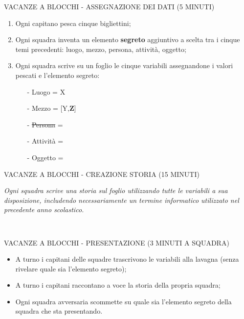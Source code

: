 \documentclass[aspectratio=1610]{beamer}
\begin{document}
\begin{frame}{VACANZE A BLOCCHI - ASSEGNAZIONE DEI DATI (5 MINUTI)} 
    \begin{enumerate}
        \item Ogni capitano pesca cinque bigliettini;
        \pause
        \item Ogni squadra inventa un elemento \textbf{segreto} aggiuntivo a scelta tra i cinque temi precedenti: luogo, mezzo, persona, attività, oggetto;
        \pause
        \item Ogni squadra scrive su un foglio le cinque variabili assegnandone i valori pescati e l'elemento segreto:
                \begin{itemize}
                    \item[-] Luogo = X
                    \item[-] Mezzo = [Y,\textbf{Z}]
                    \item[-] \sout{Persona} =
                    \item[-] Attività =
                    \item[-] Oggetto =
                \end{itemize}
    \end{enumerate}
\end{frame}

\begin{frame}{VACANZE A BLOCCHI - CREAZIONE STORIA (15 MINUTI)}
    \begin{minipage}{0.98\linewidth}
        \centering
        \huge
        \textit{Ogni squadra scrive una storia sul foglio utilizzando tutte le variabili a sua disposizione, includendo 
        necessariamente un termine informatico utilizzato nel precedente anno scolastico.}\\
    \end{minipage}\\
\end{frame}

\begin{frame}{VACANZE A BLOCCHI - PRESENTAZIONE (3 MINUTI A SQUADRA)}
    \begin{itemize}
        \item A turno i capitani delle squadre trascrivono le variabili alla lavagna (senza rivelare quale sia l'elemento segreto);
        \pause
        \item A turno i capitani raccontano a voce la storia della propria squadra;
        \pause
        \item Ogni squadra avversaria scommette su quale sia l'elemento segreto della squadra che sta presentando.
    \end{itemize}
\end{frame}
\end{document}
